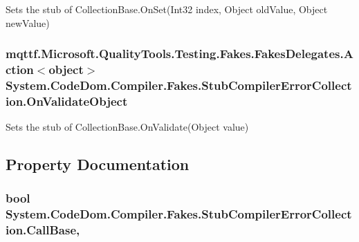 Sets the stub of Collection\-Base.\-On\-Set(\-Int32 index, Object old\-Value, Object new\-Value)

\hypertarget{class_system_1_1_code_dom_1_1_compiler_1_1_fakes_1_1_stub_compiler_error_collection_a9d3bd3352bbd127e5e38f6ebd4bc1995}{
\subsubsection[{On\-Validate\-Object}]{\setlength{\rightskip}{0pt plus 5cm}mqttf.\-Microsoft.\-Quality\-Tools.\-Testing.\-Fakes.\-Fakes\-Delegates.\-Action$<$object$>$ System.\-Code\-Dom.\-Compiler.\-Fakes.\-Stub\-Compiler\-Error\-Collection.\-On\-Validate\-Object}}\label{class_system_1_1_code_dom_1_1_compiler_1_1_fakes_1_1_stub_compiler_error_collection_a9d3bd3352bbd127e5e38f6ebd4bc1995}


Sets the stub of Collection\-Base.\-On\-Validate(\-Object value)



\subsection{Property Documentation}
\hypertarget{class_system_1_1_code_dom_1_1_compiler_1_1_fakes_1_1_stub_compiler_error_collection_a0de4fc3e35837c86a264efb1c83701e0}{
\subsubsection[{Call\-Base}]{\setlength{\rightskip}{0pt plus 5cm}bool System.\-Code\-Dom.\-Compiler.\-Fakes.\-Stub\-Compiler\-Error\-Collection.\-Call\-Base\hspace{0.3cm}{\ttfamily [get]}, {\ttfamily [set]}}}\label{class_system_1_1_code_dom_1_1_compiler_1_1_fakes_1_1_stub_compiler_error_collection_a0de4fc3e35837c86a264efb1c83701e0}


